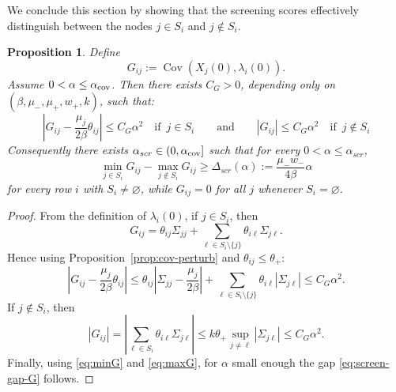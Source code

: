 \documentclass{article}
\newtheorem{proposition}{Proposition}[section]
\newcommand{\Cov}{\operatorname{Cov}}
\begin{document}
We conclude this section by showing that the screening scores effectively distinguish between the nodes $j\in S_i$ and $j\notin S_i$.
\begin{proposition}
\label{prop:Gexpand}
Define
\[
G_{ij}:=\Cov(X_j(0),\lambda_i(0)).
\]
Assume $0<\alpha\le \alpha_{\rm cov}$. Then there exists  $C_G>0$, depending only on $(\beta,\mu_-,\mu_+,w_+,k)$, such that:
\[
\left|G_{ij}-\frac{\mu_j}{2\beta}\theta_{ij}\right|\le C_G\alpha^2 \quad \text{if } \,j\in S_i \qquad \text{and} \qquad |G_{ij}|\le C_G\alpha^2 \quad \text{if } \,j\notin S_i
\]
Consequently there exists $\alpha_{scr}\in(0,\alpha_{\rm cov}]$ such that for every $0<\alpha\le \alpha_{scr}$,
\begin{equation}
\label{eq:screen-gap-G}
\min_{j\in S_i} G_{ij}-\max_{j\notin S_i}G_{ij}
\ge \Delta_{scr}(\alpha):=\frac{\mu_-w_-}{4\beta}\alpha
\end{equation}
for every row $i$ with $S_i\neq\varnothing$, while $G_{ij}=0$ for all $j$ whenever $S_i=\varnothing$.
\end{proposition}

\begin{proof}
From the definition of $\lambda_i(0)$, if $j\in S_i$, then
\[
G_{ij}=\theta_{ij}\Sigma_{jj}+\sum_{\ell\in S_i\setminus\{j\}}\theta_{i\ell}\Sigma_{j\ell}.
\]
Hence using Proposition~\ref{prop:cov-perturb} and $\theta_{ij}\leq \theta_+$:
\begin{equation}
    \label{eq:minG}
    \left|G_{ij}-\frac{\mu_j}{2\beta}\theta_{ij}\right|
    \le \theta_{ij}\left|\Sigma_{jj}-\frac{\mu_j}{2\beta}\right| + \sum_{\ell\in S_i\setminus\{j\}} \theta_{i\ell}|\Sigma_{j\ell}|
    \le C_G\alpha^2.
\end{equation}
If $j\notin S_i$, then
\begin{equation}
    \label{eq:maxG}
    |G_{ij}| = \left|\sum_{\ell\in S_i}\theta_{i\ell}\Sigma_{j\ell}\right|
    \le k\theta_+ \sup_{j\neq \ell}|\Sigma_{j\ell}|
    \le C_G\alpha^2.
\end{equation}
Finally, using \eqref{eq:minG} and \eqref{eq:maxG}, for $\alpha$ small enough the gap \eqref{eq:screen-gap-G} follows.
\end{proof}
\end{document}
